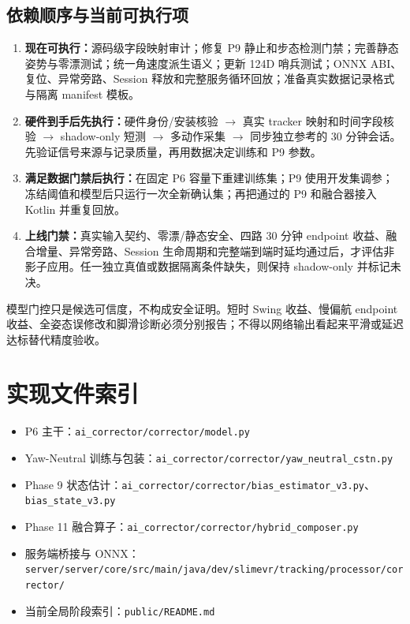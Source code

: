 \documentclass[UTF8,11pt,a4paper]{ctexart}
\begin{document}
\subsection{依赖顺序与当前可执行项}
\begin{enumerate}
  \item \textbf{现在可执行：}源码级字段映射审计；修复 P9 静止和步态检测门禁；完善静态姿势与零漂测试；统一角速度派生语义；更新 124D 哨兵测试；ONNX ABI、复位、异常旁路、Session 释放和完整服务循环回放；准备真实数据记录格式与隔离 manifest 模板。
  \item \textbf{硬件到手后先执行：}硬件身份/安装核验 \(\to\) 真实 tracker 映射和时间字段核验 \(\to\) shadow-only 短测 \(\to\) 多动作采集 \(\to\) 同步独立参考的 30 分钟会话。先验证信号来源与记录质量，再用数据决定训练和 P9 参数。
  \item \textbf{满足数据门禁后执行：}在固定 P6 容量下重建训练集；P9 使用开发集调参；冻结阈值和模型后只运行一次全新确认集；再把通过的 P9 和融合器接入 Kotlin 并重复回放。
  \item \textbf{上线门禁：}真实输入契约、零漂/静态安全、四路 30 分钟 endpoint 收益、融合增量、异常旁路、Session 生命周期和完整端到端时延均通过后，才评估非影子应用。任一独立真值或数据隔离条件缺失，则保持 shadow-only 并标记未决。
\end{enumerate}

模型门控只是候选可信度，不构成安全证明。短时 Swing 收益、慢偏航 endpoint 收益、全姿态误修改和脚滑诊断必须分别报告；不得以网络输出看起来平滑或延迟达标替代精度验收。

\section{实现文件索引}
\begin{itemize}
  \item P6 主干：\texttt{ai\_corrector/corrector/model.py}
  \item Yaw-Neutral 训练与包装：\texttt{ai\_corrector/corrector/yaw\_neutral\_cstn.py}
  \item Phase 9 状态估计：\texttt{ai\_corrector/corrector/bias\_estimator\_v3.py}、\texttt{bias\_state\_v3.py}
  \item Phase 11 融合算子：\texttt{ai\_corrector/corrector/hybrid\_composer.py}
  \item 服务端桥接与 ONNX：\texttt{server/server/core/src/main/java/dev/slimevr/tracking/processor/corrector/}
  \item 当前全局阶段索引：\texttt{public/README.md}
\end{itemize}
\end{document}
